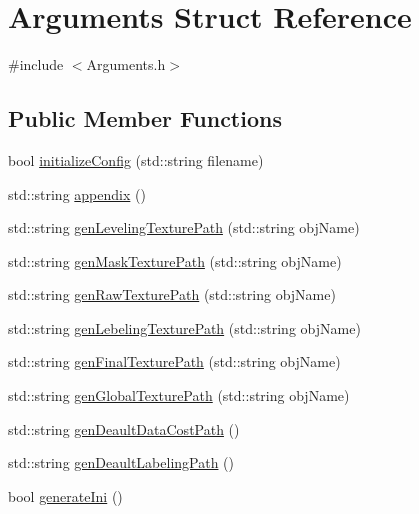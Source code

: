\hypertarget{struct_arguments}{}\section{Arguments Struct Reference}
\label{struct_arguments}


{\ttfamily \#include $<$Arguments.\+h$>$}

\subsection*{Public Member Functions}
\begin{DoxyCompactItemize}
\item 
bool \hyperlink{struct_arguments_adb3df83131fa2be8783755b93c28c3de}{initialize\+Config} (std\+::string filename)
\item 
std\+::string \hyperlink{struct_arguments_a693a6a2a4334f5e34b3eb5ed6a555b28}{appendix} ()
\item 
std\+::string \hyperlink{struct_arguments_a84cff19e3bdd988ba096e1a81e747103}{gen\+Leveling\+Texture\+Path} (std\+::string obj\+Name)
\item 
std\+::string \hyperlink{struct_arguments_acc8d0c6a9477669bee3d9fe79e0b6d6c}{gen\+Mask\+Texture\+Path} (std\+::string obj\+Name)
\item 
std\+::string \hyperlink{struct_arguments_af256b45e3009486a4ea5066f8b7a080f}{gen\+Raw\+Texture\+Path} (std\+::string obj\+Name)
\item 
std\+::string \hyperlink{struct_arguments_ac2161fcafef758c6418e6d7113fedee2}{gen\+Lebeling\+Texture\+Path} (std\+::string obj\+Name)
\item 
std\+::string \hyperlink{struct_arguments_ae4c2ab8514254a581f2124d4095ffe06}{gen\+Final\+Texture\+Path} (std\+::string obj\+Name)
\item 
std\+::string \hyperlink{struct_arguments_ab6012180dadee8fff0a7271aafd96089}{gen\+Global\+Texture\+Path} (std\+::string obj\+Name)
\item 
std\+::string \hyperlink{struct_arguments_a3f54b425cb0c05cda997be2f690040a4}{gen\+Deault\+Data\+Cost\+Path} ()
\item 
std\+::string \hyperlink{struct_arguments_ad99ef1f1635874fd7dcac5b3a48dabec}{gen\+Deault\+Labeling\+Path} ()
\item 
bool \hyperlink{struct_arguments_a6db8fa82b73c39649ab151ef63085f0f}{generate\+Ini} ()
\end{DoxyCompactItemize}
